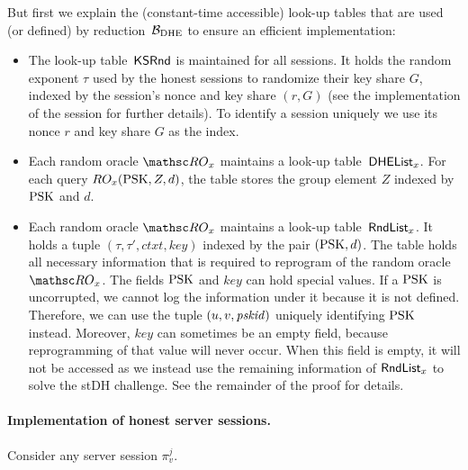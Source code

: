 		But first we explain the (constant-time accessible) look-up tables that are used (or defined) by reduction~$\mathcal{B}_{\mathrm{DHE}}$ to ensure an efficient implementation:
		\begin{itemize}
			\item The look-up table~$\mathsf{KSRnd}$ is maintained for all sessions. It holds the random exponent $\tau$ used by the honest sessions to randomize their key share $G$, indexed by the session's nonce and key share $(r,G)$ (see the implementation of the session for further details). To identify a session uniquely we use its nonce $r$ and key share $G$ as the index.
			\item Each random oracle $\RO_x$ maintains a look-up table~$\mathsf{DHEList}_x$. For each query $RO_x(\mathrm{PSK}, Z, d)$, the table stores the group element $Z$ indexed by $\mathrm{PSK}$ and $d$.
			\item Each random oracle $\RO_x$ maintains a look-up table~$\mathsf{RndList}_x$. It holds a tuple $(\tau,\tau',\mathit{ctxt},\mathit{key})$ 
 indexed by the pair $(\mathrm{PSK}, d)$.
			The table holds all necessary information that is required to reprogram of the random oracle $\RO_x$.
			The fields $\mathrm{PSK}$ and $\mathit{key}$ can hold special values.
			If a $\mathrm{PSK}$ is uncorrupted, we cannot log the information under it because it is not defined.
			Therefore, we can use the tuple $(u,v,\mathit{pskid})$ uniquely identifying $\mathrm{PSK}$ instead.
			Moreover, $\mathit{key}$ can sometimes be an empty field, because reprogramming of that value will never occur. When this field is empty, it will not be accessed as we instead use the remaining information of $\mathsf{RndList}_x$ to solve the stDH challenge. 
			See the remainder of the proof for details.
		\end{itemize}

	
	\paragraph{Implementation of honest server sessions.}
	Consider any server session $\pi_v^j$.
	
